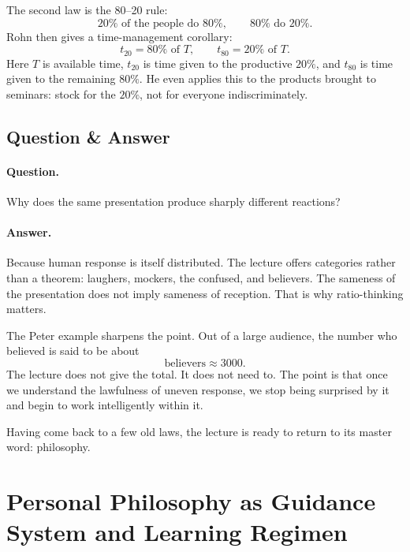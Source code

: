 The second law is the 80--20 rule:
\begin{equation}
20\%\text{ of the people do }80\%, \qquad 80\%\text{ do }20\%.
\end{equation}
Rohn then gives a time-management corollary:
\begin{equation}
t_{20}=80\%\text{ of }T, \qquad t_{80}=20\%\text{ of }T.
\end{equation}
Here \(T\) is available time, \(t_{20}\) is time given to the productive \(20\%\), and \(t_{80}\) is time given to the remaining \(80\%\). He even applies this to the products brought to seminars: stock for the \(20\%\), not for everyone indiscriminately.

\subsection{Question \& Answer}

\paragraph{Question.} Why does the same presentation produce sharply different reactions?

\paragraph{Answer.} Because human response is itself distributed. The lecture offers categories rather than a theorem: laughers, mockers, the confused, and believers. The sameness of the presentation does not imply sameness of reception. That is why ratio-thinking matters.

The Peter example sharpens the point. Out of a large audience, the number who believed is said to be about
\begin{equation}
\text{believers} \approx 3000.
\end{equation}
The lecture does not give the total. It does not need to. The point is that once we understand the lawfulness of uneven response, we stop being surprised by it and begin to work intelligently within it.

Having come back to a few old laws, the lecture is ready to return to its master word: philosophy.

\section{Personal Philosophy as Guidance System and Learning Regimen}

